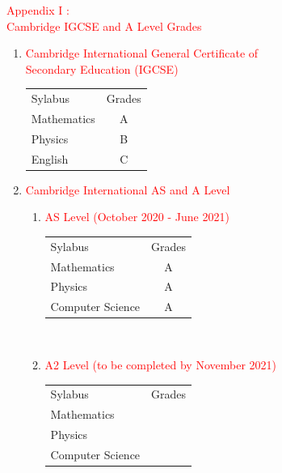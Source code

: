 \documentclass[a4paper]{article}
\begin{document}
\pagebreak


\textcolor{red}{\huge Appendix I :\hfill}\\
\vskip 0.2cm
\textcolor{red}{\Large Cambridge IGCSE and A Level Grades}\\
\vskip 0.5cm

\begin{enumerate}
\item {\textcolor{red}{\Large Cambridge International General Certificate of\\ Secondary Education (IGCSE)}\\

\begin{tabular}{lc}
Sylabus           &    Grades\\
Mathematics        &     A \\
Physics            &     B \\
English            &     C 
\end{tabular}
}
  
\item {\textcolor{red}{\Large Cambridge International AS and A Level}  \\

\begin{enumerate}    
\item {\textcolor{red}{\large AS Level (October 2020 - June 2021)} \\

\begin{tabular}{lc}
Sylabus           &    Grades\\
Mathematics        &      A  \\
Physics            &      A  \\
Computer Science   &      A  \\
\end{tabular}}\\

\item {\textcolor{red}{\large A2 Level (to be completed by November 2021)}\\

\begin{tabular}{lc}
Sylabus & Grades \\  
Mathematics  & \\
Physics      &  \\
Computer Science & \\
\end{tabular}
}
\end{enumerate}
  }
\end{enumerate}  
\end{document}
